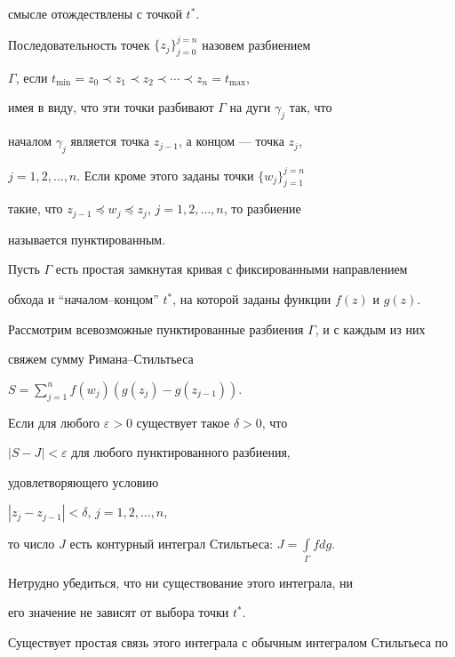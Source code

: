 смысле отождествлены с точкой $t^*$.





Последовательность точек $\{z_j\}_{j=0}^{j=n}$ назовем разбиением


$\Gamma$, если $t_{\min}=z_0\prec z_1\prec z_2\prec\dotsb\prec z_n=t_{\max}$,


имея в виду, что эти точки разбивают $\Gamma$ на дуги $\gamma_j$ так, что


началом $\gamma_j$ является точка $z_{j-1}$, а концом --- точка $z_j$,


$j = 1,2,\dotsc, n$. Если кроме этого заданы точки $\{w_j\}_{j=1}^{j=n}$


такие, что $z_{j-1}\preceq w_j\preceq z_j$, $j=1,2,\dotsc,n$, то разбиение


называется пунктированным.





\begin{defn}


Пусть $\Gamma$ есть простая замкнутая кривая с фиксированными направлением


обхода и ``началом--концом'' $t^*$, на которой заданы функции $f(z)$ и $g(z)$.


Рассмотрим всевозможные пунктированные разбиения $\Gamma$, и с каждым из них


свяжем сумму Римана--Стильтьеса


$S = \sum\limits_{j=1}^{n} f(w_j)(g(z_j) - g(z_{j-1}))$.


Если для любого $\varepsilon > 0$ существует такое $\delta >0$, что


$\left|S-J\right| <\varepsilon$ для любого пунктированного разбиения,


удовлетворяющего условию


$\left|z_j - z_{j-1}\right| < \delta$, $j=1,2,\dots,n$,


то число $J$ есть контурный интеграл Стильтьеса: $J=\int\limits_{\Gamma}fdg$.


\end{defn}





Нетрудно убедиться, что ни существование этого интеграла, ни


его значение не зависят от выбора точки $t^*$.





Существует простая связь этого интеграла с обычным интегралом Стильтьеса по


